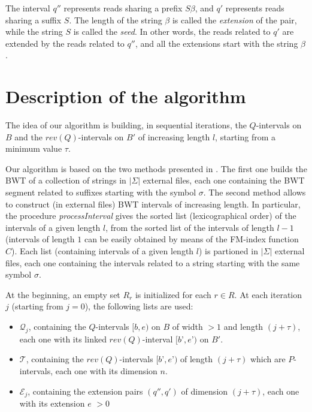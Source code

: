 \documentclass[11pt]{article}
\begin{document}
The interval $q''$ represents reads sharing a prefix $S\beta$, and $q'$ represents reads sharing a suffix $S$. The length of the string $\beta$ is called the \emph{extension} of the pair, while the string $S$ is called the \emph{seed}. In other words, the reads related to $q'$ are extended by the reads related to $q''$, and all the extensions start with the string $\beta$. 


\section*{Description of the algorithm}

The idea of our algorithm is building, in sequential iterations, the $Q$-intervals on $B$ and the $rev(Q)$-intervals on $B'$ of increasing length $l$, starting from a minimum value $\tau$.

Our algorithm is based on the two methods presented in \cite{Bauer11, Cox12}. The first one builds the BWT of a collection of strings in $|\Sigma|$ external files, each one containing the BWT segment related to suffixes starting with the symbol $\sigma$. The second method allows to construct (in external files) BWT intervals of increasing length. 
In particular, the procedure \emph{processInterval} gives the sorted list (lexicographical order) of the intervals of a given length $l$, from the sorted list of the intervals of length $l-1$ (intervals of length $1$ can be easily obtained by means of the FM-index function $C$).
Each list (containing intervals of a given length $l$) is partioned in $|\Sigma|$ external files, each one containing the intervals related to a string starting with the same symbol $\sigma$. 

At the beginning, an empty set $R_r$ is initialized for each $r \in R$. At each iteration $j$ (starting from $j=0$), the following lists are used:
\begin{itemize}
\item $\mathcal{Q}_j$, containing the $Q$-intervals $[b, e)$ on $B$ of width $>1$ and length $(j+\tau)$, each one with its linked $rev(Q)$-interval $[b’, e’)$ on $B'$.
\item $\mathcal{T}$, containing the $rev(Q)$-intervals $[b’, e’)$ of length $(j+\tau)$ which are $P$-intervals, each one with its dimension $n$.
\item $\mathcal{E}_j$, containing the extension pairs $(q'', q')$ of dimension $(j+\tau)$, each one with its extension $e$ $> 0$
\end{itemize}
\end{document}
